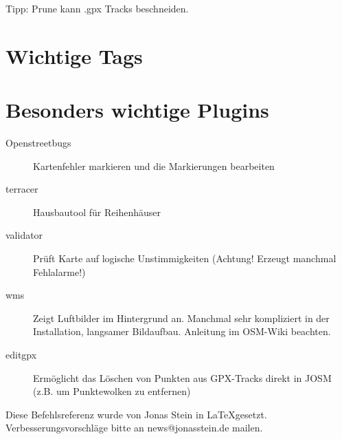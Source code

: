 \documentclass[a4paper,11pt,notumble]{leaflet}
\begin{document}
Tipp: Prune kann .gpx Tracks beschneiden. 


\newpage
\section*{Wichtige Tags}

\section*{Besonders wichtige Plugins}
\begin{description}
\item[Openstreetbugs] Kartenfehler markieren und die Markierungen bearbeiten
\item[terracer] Hausbautool für Reihenhäuser
\item[validator] Prüft Karte auf logische Unstimmigkeiten
(Achtung! Erzeugt manchmal Fehlalarme!) 
\item[wms] Zeigt Luftbilder im Hintergrund an. Manchmal sehr kompliziert in der Installation, langsamer Bildaufbau. Anleitung im OSM-Wiki beachten.
\item[editgpx] Ermöglicht das Löschen von Punkten aus GPX-Tracks direkt in JOSM (z.B. um Punktewolken zu entfernen)
\end{description}

\newpage
Diese Befehlsreferenz wurde von Jonas Stein in \LaTeX gesetzt.
Verbesserungsvorschläge bitte an news@jonasstein.de mailen.
\end{document}
